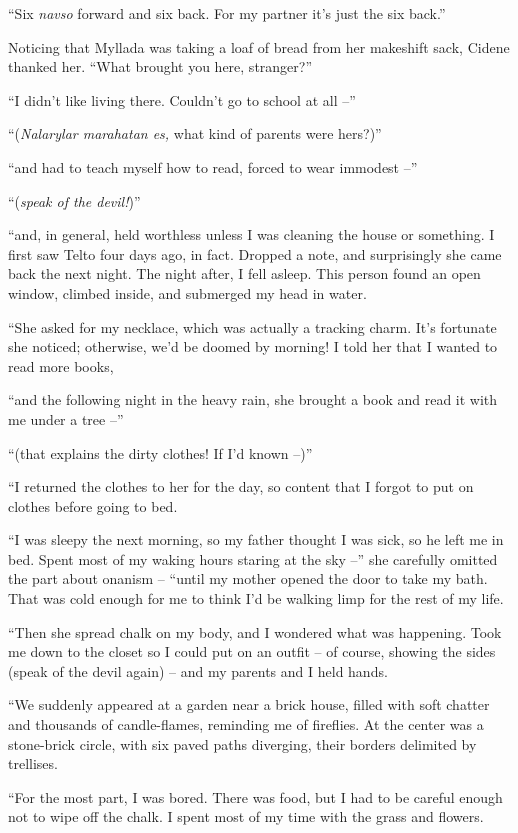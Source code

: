 ``Six \emph{navso} forward and six back. For my partner it's just the six back.''

Noticing that Myllada was taking a loaf of bread from her makeshift sack, Cidene thanked her. ``What brought you here, stranger?''

``I didn't like living there. Couldn't go to school at all --''

``(\emph{Nalarylar marahatan es,} what kind of parents were hers?)''

``and had to teach myself how to read, forced to wear immodest --''

``(\emph{speak of the devil!})''

``and, in general, held worthless unless I was cleaning the house or something. I first saw Telto four days ago, in fact. Dropped a note, and surprisingly she came back the next night. The night after, I fell asleep. This person found an open window, climbed inside, and submerged my head in water.

``She asked for my necklace, which was actually a tracking charm. It's fortunate she noticed; otherwise, we'd be doomed by morning! I told her that I wanted to read more books,

``and the following night in the heavy rain, she brought a book and read it with me under a tree --''

``(that explains the dirty clothes! If I'd known --)''

``I returned the clothes to her for the day, so content that I forgot to put on clothes before going to bed.

``I was sleepy the next morning, so my father thought I was sick, so he left me in bed. Spent most of my waking hours staring at the sky --'' she carefully omitted the part about onanism -- ``until my mother opened the door to take my bath. That was cold enough for me to think I'd be walking limp for the rest of my life.

``Then she spread chalk on my body, and I wondered what was happening. Took me down to the closet so I could put on an outfit -- of course, showing the sides (speak of the devil again) -- and my parents and I held hands.

``We suddenly appeared at a garden near a brick house, filled with soft chatter and thousands of candle-flames, reminding me of fireflies. At the center was a stone-brick circle, with six paved paths diverging, their borders delimited by trellises.

``For the most part, I was bored. There was food, but I had to be careful enough not to wipe off the chalk. I spent most of my time with the grass and flowers.

